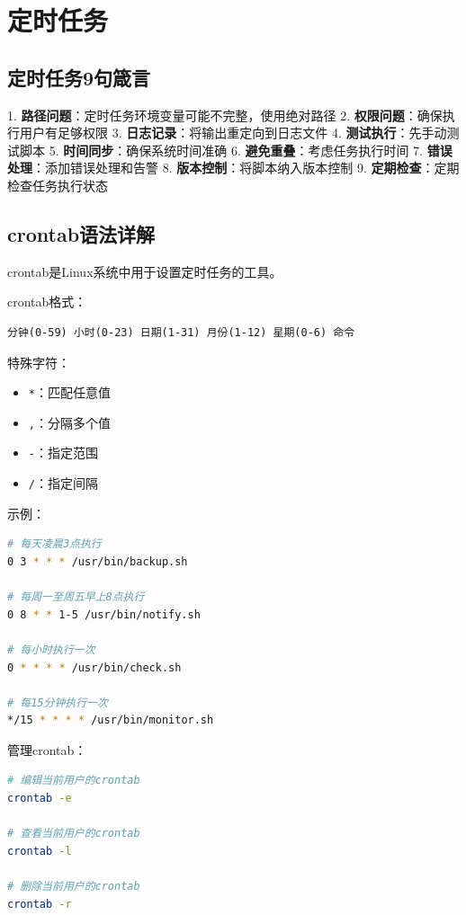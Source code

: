 \documentclass[12pt,UTF8]{ctexbook}
\begin{document}
\chapter{定时任务}
\label{chap:cron}

\section{定时任务9句箴言}
\label{sec:cron-principles}

1. \textbf{路径问题}：定时任务环境变量可能不完整，使用绝对路径
2. \textbf{权限问题}：确保执行用户有足够权限
3. \textbf{日志记录}：将输出重定向到日志文件
4. \textbf{测试执行}：先手动测试脚本
5. \textbf{时间同步}：确保系统时间准确
6. \textbf{避免重叠}：考虑任务执行时间
7. \textbf{错误处理}：添加错误处理和告警
8. \textbf{版本控制}：将脚本纳入版本控制
9. \textbf{定期检查}：定期检查任务执行状态

\section{crontab语法详解}
\label{sec:crontab-syntax}

crontab是Linux系统中用于设置定时任务的工具。

crontab格式：
\begin{lstlisting}
分钟(0-59) 小时(0-23) 日期(1-31) 月份(1-12) 星期(0-6) 命令
\end{lstlisting}

特殊字符：
\begin{itemize}
    \item \texttt{*}：匹配任意值
    \item \texttt{,}：分隔多个值
    \item \texttt{-}：指定范围
    \item \texttt{/}：指定间隔
\end{itemize}

示例：
\begin{lstlisting}[language=bash]
# 每天凌晨3点执行
0 3 * * * /usr/bin/backup.sh

# 每周一至周五早上8点执行
0 8 * * 1-5 /usr/bin/notify.sh

# 每小时执行一次
0 * * * * /usr/bin/check.sh

# 每15分钟执行一次
*/15 * * * * /usr/bin/monitor.sh
\end{lstlisting}

管理crontab：
\begin{lstlisting}[language=bash]
# 编辑当前用户的crontab
crontab -e

# 查看当前用户的crontab
crontab -l

# 删除当前用户的crontab
crontab -r
\end{lstlisting}
\end{document}
